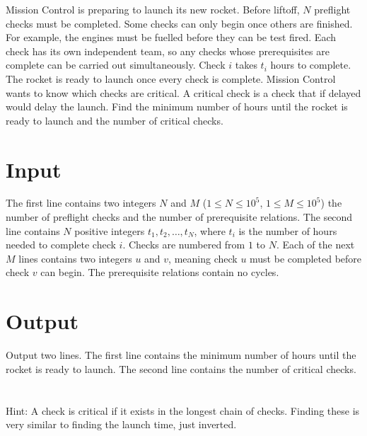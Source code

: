 Mission Control is preparing to launch its new rocket. Before liftoff, $N$ preflight
checks must be completed. Some checks can only begin once others are finished. For
example, the engines must be fuelled before they can be test fired. Each check has its
own independent team, so any checks whose prerequisites are complete can be carried out
simultaneously. Check $i$ takes $t_i$ hours to complete. The rocket is ready to launch
once every check is complete. Mission Control wants to know which checks are critical.
A critical check is a check that if delayed would delay the launch. Find the minimum number of hours 
until the rocket is ready to launch and the number of critical checks.

\section*{Input}
The first line contains two integers $N$ and $M$ ($1 \leq N \leq 10^5$, $1 \leq M \leq 10^5$)  
the number of preflight checks and the number of prerequisite relations.
The second line contains $N$ positive integers $t_1, t_2, \ldots, t_N$, where $t_i$ is
the number of hours needed to complete check $i$. Checks are numbered from $1$ to $N$.
Each of the next $M$ lines contains two integers $u$ and $v$, meaning check $u$ must be
completed before check $v$ can begin. The prerequisite relations contain no cycles.

\section*{Output}
Output two lines. The first line contains the minimum number of hours until the
rocket is ready to launch. The second line contains the number of critical checks.
\section*{} Hint: A check is critical if it exists in the longest chain of checks.
Finding these is very similar to finding the launch time, just inverted.